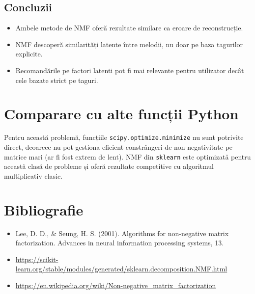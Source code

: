 \documentclass[12pt,a4paper]{article}
\begin{document}
	\subsection{Concluzii}
	
	\begin{itemize}
		\item Ambele metode de NMF oferă rezultate similare ca eroare de reconstrucție.
		\item NMF descoperă similarități latente între melodii, nu doar pe baza tagurilor explicite.
		\item Recomandările pe factori latenti pot fi mai relevante pentru utilizator decât cele bazate strict pe taguri.
	\end{itemize}
	
	\section{Comparare cu alte funcții Python}
	
	Pentru această problemă, funcțiile \texttt{scipy.optimize.minimize} nu sunt potrivite direct, deoarece nu pot gestiona eficient constrângeri de non-negativitate pe matrice mari (ar fi fost extrem de lent). NMF din \texttt{sklearn} este optimizată pentru această clasă de probleme și oferă rezultate competitive cu algoritmul multiplicativ clasic.
	
	\section{Bibliografie}
	
	\begin{itemize}
		\item Lee, D. D., \& Seung, H. S. (2001). Algorithms for non-negative matrix factorization. Advances in neural information processing systems, 13.
		\item \url{https://scikit-learn.org/stable/modules/generated/sklearn.decomposition.NMF.html}
		\item \url{https://en.wikipedia.org/wiki/Non-negative_matrix_factorization}
	\end{itemize}
	
\end{document}
